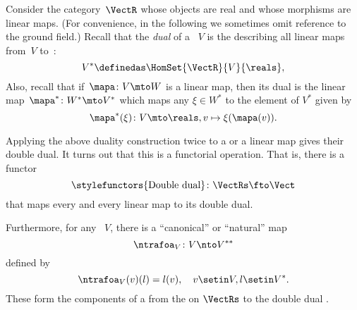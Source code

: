 \begin{example}
    \label{ex:Vect}
    Consider the category~$\VectR$ whose objects are real  and whose morphisms are linear maps.
    (For convenience, in the following we sometimes omit reference to the ground field.)
    Recall that the \emph{dual} of a ~$V$ is the  describing all linear maps from~$V$ to~\reals:
    \begin{equation}
        \label{eq:dual-vector-space}
        V^* \definedas \HomSet{\VectR}{V}{\reals},
    \end{equation}
    Also, recall that if~$\mapa\colon V \mto W$ is a linear map, then its dual is the linear map~$\mapa^* \linebreak[1] \colon W^* \mto V^*$ which maps any $\xi \in W^*$ to the element of $V^*$ given by
    \begin{equation}
        \mapa^*(\xi) \colon V \mto \reals, v \mapsto \xi(\mapa(v)).
    \end{equation}

    Applying the above duality construction twice to a  or a linear map gives their double dual.
    It turns out that this is a functorial operation.
    That is, there is a functor
    \begin{equation}
        \label{eq:double-dual-functor}
        \text{\stylefunctors{Double dual}}\colon \VectRs \fto \Vect
    \end{equation}
    that maps every  and every linear map to its double dual.

    Furthermore, for any ~$V$, there is a ``canonical'' or ``natural'' map
    \begin{equation}
        \ntrafoa_V \colon V \nto V^{**}
    \end{equation}
    defined by
    \begin{equation}
        \label{eq:natural-trafo-to-double-dual}
        \ntrafoa_V(v)(l) = l(v), \quad v \setin V, l \setin V^*.
    \end{equation}
    These form the components of a  from the  on $\VectRs$ to the double dual .
\end{example}

